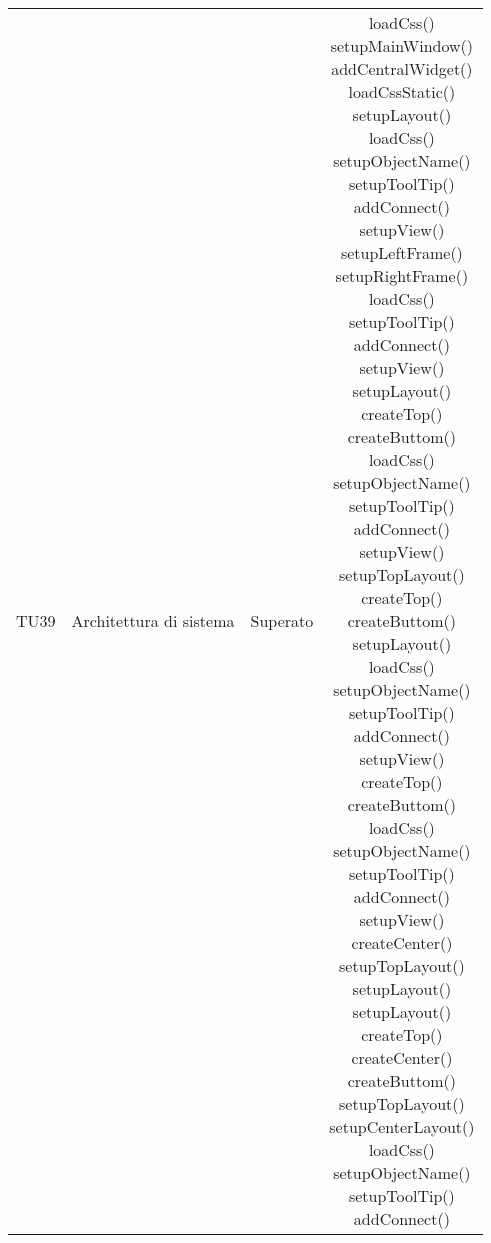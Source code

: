 \begin{center}
\begin{longtable}{|c|c|c|c|}
\hline
TU39 & \parbox[t]{\larghezza}{ Architettura di sistema } & Superato & \parbox[t]{\dimTipo} { loadCss() \\ setupMainWindow() \\ addCentralWidget() \\ loadCssStatic() \\ setupLayout() \\ loadCss() \\ setupObjectName() \\ setupToolTip() \\ addConnect() \\ setupView() \\ setupLeftFrame() \\ setupRightFrame() \\ loadCss() \\ setupToolTip() \\ addConnect() \\ setupView() \\ setupLayout() \\ createTop() \\ createButtom() \\ loadCss() \\ setupObjectName() \\ setupToolTip() \\ addConnect() \\ setupView() \\ setupTopLayout() \\ createTop() \\ createButtom() \\ setupLayout() \\ loadCss() \\ setupObjectName() \\ setupToolTip() \\ addConnect() \\ setupView() \\ createTop() \\ createButtom() \\ loadCss() \\ setupObjectName() \\ setupToolTip() \\ addConnect() \\ setupView() \\ createCenter() \\ setupTopLayout() \\ setupLayout() \\ setupLayout() \\ createTop() \\ createCenter() \\ createButtom() \\ setupTopLayout() \\ setupCenterLayout() \\ loadCss() \\ setupObjectName() \\ setupToolTip() \\ addConnect() \\}\\


\end{longtable}
\end{center}
